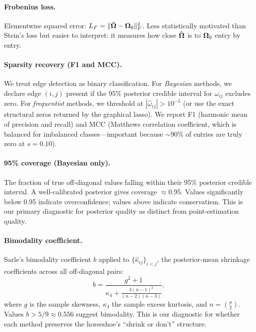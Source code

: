 \documentclass[10pt,conference,compsoc]{IEEEtran}
\begin{document}
\paragraph{Frobenius loss.} Elementwise squared error: $L_F = \|\hat{\bm{\Omega}} - \bm{\Omega}_0\|_F^2$. Less statistically motivated than Stein's loss but easier to interpret: it measures how close $\hat{\bm{\Omega}}$ is to $\bm{\Omega}_0$ entry by entry.

\paragraph{Sparsity recovery (F1 and MCC).} We treat edge detection as binary classification. For \emph{Bayesian} methods, we declare edge $(i,j)$ present if the 95\% posterior credible interval for $\omega_{ij}$ excludes zero. For \emph{frequentist} methods, we threshold at $|\hat\omega_{ij}| > 10^{-5}$ (or use the exact structural zeros returned by the graphical lasso). We report F1 (harmonic mean of precision and recall) and MCC (Matthews correlation coefficient, which is balanced for imbalanced classes---important because $\sim$90\% of entries are truly zero at $s = 0.10$).

\paragraph{95\% coverage (Bayesian only).} The fraction of true off-diagonal values falling within their 95\% posterior credible interval. A well-calibrated posterior gives coverage $\approx 0.95$. Values significantly below 0.95 indicate overconfidence; values above indicate conservatism. This is our primary diagnostic for posterior quality as distinct from point-estimation quality.

\paragraph{Bimodality coefficient.} Sarle's bimodality coefficient $b$ applied to $\{\hat\kappa_{ij}\}_{i<j}$, the posterior-mean shrinkage coefficients across all off-diagonal pairs:
\begin{equation}
  b = \frac{g^2 + 1}{\kappa_4 + \frac{3(n-1)^2}{(n-2)(n-3)}},
  \label{eq:bimodality}
\end{equation}
where $g$ is the sample skewness, $\kappa_4$ the sample excess kurtosis, and $n = \binom{p}{2}$. Values $b > 5/9 \approx 0.556$ suggest bimodality. This is our diagnostic for whether each method preserves the horseshoe's ``shrink or don't'' structure.
\end{document}
